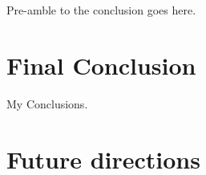 Pre-amble to the conclusion goes here.

\section{Final Conclusion}
My Conclusions.

\section{Future directions}
